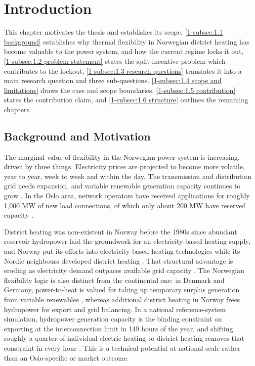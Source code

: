 \section{Introduction}
\label{1-sec:1}

This chapter motivates the thesis and establishes its scope. \autoref{1-subsec:1.1 background} establishes why thermal flexibility in Norwegian district heating has become valuable to the power system, and how the current regime locks it out, \autoref{1-subsec:1.2 problem statement} states the split-incentive problem which contributes to the lockout, \autoref{1-subsec:1.3 research questions} translates it into a main research question and three sub-questions. \autoref{1-subsec:1.4 scope and limitations} draws the case and scope boundaries, \autoref{1-subsec:1.5 contribution} states the contribution claim, and \autoref{1-subsec:1.6 structure} outlines the remaining chapters.

\subsection{Background and Motivation}
\label{1-subsec:1.1 background}
The marginal value of flexibility in the Norwegian power system is increasing, driven by three things. Electricity prices are projected to become more volatile, year to year, week to week and within the day. The transmission and distribution grid needs expansion, and variable renewable generation capacity continues to grow \cite{NVE_langsiktig_2023}. In the Oslo area, network operators have received applications for roughly 1,000 MW of new load connections, of which only about 200 MW have reserved capacity \cite{Thema_fjernvarme_2024}. 

District heating was non-existent in Norway before the 1980s since abundant reservoir hydropower laid the groundwork for an electricity-based heating supply, and Norway put its efforts into electricity-based heating technologies while its Nordic neighbours developed district heating \cite{sandberg_framework_2018}. That structural advantage is eroding as electricity demand outpaces available grid capacity \cite{NVE_langsiktig_2023}. The Norwegian flexibility logic is also distinct from the continental one: in Denmark and Germany, power-to-heat is valued for taking up temporary surplus generation from variable renewables \cite{bloes_power--heat_2018}, whereas additional district heating in Norway frees hydropower for export and grid balancing. In a national reference-system simulation, hydropower generation capacity is the binding constraint on exporting at the interconnection limit in 149 hours of the year, and shifting roughly a quarter of individual electric heating to district heating removes that constraint in every hour \cite{askeland_balancing_2019}. This is a technical potential at national scale rather than an Oslo-specific or market outcome.

